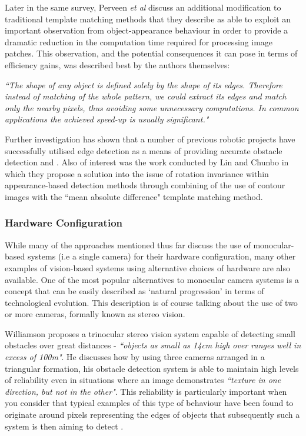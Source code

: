 Later in the same survey, Perveen \textit{et al} discuss an additional modification to traditional template matching methods that they describe as able to exploit an important observation from object-appearance behaviour in order to provide a dramatic reduction in the computation time required for processing image patches. This observation, and the potential consequences it can pose in terms of efficiency gains, was described best by the authors themselves:

\indent \textit{``The shape of any object is defined solely by the shape of its edges. Therefore instead of matching of the whole pattern, we could extract its edges and match only the nearby pixels, thus avoiding some unnecessary computations. In common applications the achieved speed-up is usually significant."} \cite{perveen}

Further investigation has shown that a number of previous robotic projects have successfully utilised edge detection as a means of providing accurate obstacle detection \cite{hanumante} and \cite{borenstein}. Also of interest was the work conducted by Lin and Chunbo \cite{lin} in which they propose a solution into the issue of rotation invariance within appearance-based detection methods through combining of the use of contour images with the ``mean absolute difference" template matching method. 

\subsubsection{Hardware Configuration}
 
While many of the approaches mentioned thus far discuss the use of monocular-based systems (i.e a single camera) for their hardware configuration, many other examples of vision-based systems using alternative choices of hardware are also available. One of the most popular alternatives to monocular camera systems is a concept that can be easily described as `natural progression' in terms of technological evolution. This description is of course talking about the use of two or more cameras, formally known as stereo vision. 

Williamson \cite{williamson} proposes a trinocular stereo vision system capable of detecting small obstacles over great distances - \textit{``objects as small as 14cm high over ranges well in excess of 100m"}. He discusses how by using three cameras arranged in a triangular formation, his obstacle detection system is able to maintain high levels of reliability even in situations where an image demonstrates \textit{``texture in one direction, but not in the other"}. This reliability is particularly important when you consider that typical examples of this type of behaviour have been found to originate around pixels representing the edges of objects that subsequently such a system is then aiming to detect \cite{williamson}. 

